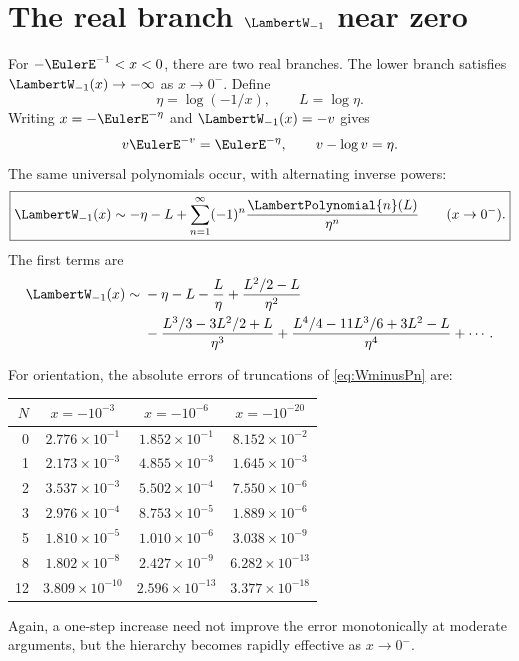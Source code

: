 \documentclass[11pt,oneside,openany]{book}
\begin{document}
\section{The real branch \texorpdfstring{\(\LambertW_{-1}\)}{W-1} near zero}
For \(-\EulerE^{-1}<x<0\), there are two real branches.  The lower branch satisfies
\(\LambertW_{-1}(x)\to-\infty\) as \(x\to0^-\).  Define
\begin{equation}\label{eq:etaWm}
 \eta=\log(-1/x),
 \qquad
 L=\log\eta.
\end{equation}
Writing \(x=-\EulerE^{-\eta}\) and \(\LambertW_{-1}(x)=-v\) gives
\[
 v\EulerE^{-v}=\EulerE^{-\eta},
 \qquad
 v-\log v=\eta.
\]
The same universal polynomials occur, with alternating inverse powers:
\begin{equation}\label{eq:WminusPn}
 \boxed{
 \LambertW_{-1}(x)
 \sim-\eta-L+
 \sum_{n=1}^{\infty}(-1)^n\frac{\LambertPolynomial{n}(L)}{\eta^n}
 \qquad(x\to0^-).
 }
\end{equation}
The first terms are
\begin{align}
 \LambertW_{-1}(x)\sim{}&-\eta-L-\frac{L}{\eta}
 +\frac{L^2/2-L}{\eta^2}\notag\\
 &-\frac{L^3/3-3L^2/2+L}{\eta^3}
 +\frac{L^4/4-11L^3/6+3L^2-L}{\eta^4}
 +\cdots.
 \label{eq:Wminusexpanded}
\end{align}

For orientation, the absolute errors of truncations of
\cref{eq:WminusPn} are:
\begin{center}
\begin{tabular}{@{}rccc@{}}
\toprule
\(N\) & \(x=-10^{-3}\) & \(x=-10^{-6}\) & \(x=-10^{-20}\) \\
\midrule
0  & \(2.776\times 10^{-1}\) & \(1.852\times 10^{-1}\) & \(8.152\times 10^{-2}\) \\
1  & \(2.173\times 10^{-3}\) & \(4.855\times 10^{-3}\) & \(1.645\times 10^{-3}\) \\
2  & \(3.537\times 10^{-3}\) & \(5.502\times 10^{-4}\) & \(7.550\times 10^{-6}\) \\
3  & \(2.976\times 10^{-4}\) & \(8.753\times 10^{-5}\) & \(1.889\times 10^{-6}\) \\
5  & \(1.810\times 10^{-5}\) & \(1.010\times 10^{-6}\) & \(3.038\times 10^{-9}\) \\
8  & \(1.802\times 10^{-8}\) & \(2.427\times 10^{-9}\) & \(6.282\times 10^{-13}\) \\
12 & \(3.809\times 10^{-10}\) & \(2.596\times 10^{-13}\) & \(3.377\times 10^{-18}\) \\
\bottomrule
\end{tabular}
\end{center}
Again, a one-step increase need not improve the error monotonically at moderate
arguments, but the hierarchy becomes rapidly effective as \(x\to0^-\).
\end{document}
